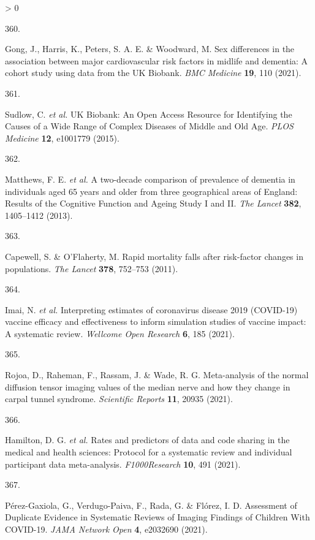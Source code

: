 \documentclass[a4paper, twoside]{templates/ociamthesis}
\newlength{\cslhangindent}
\newlength{\csllabelwidth}
\newenvironment{CSLReferences}[3] %
 {%
  \setlength{\parindent}{0pt}
  \ifodd #1 \everypar{\setlength{\hangindent}{\cslhangindent}}\ignorespaces\fi
  \ifnum #2 > 0
  \setlength{\parskip}{#2\baselineskip}
  \fi
 }%
 {}
\newcommand{\CSLLeftMargin}[1]{\parbox[t]{\maxof{\widthof{#1}}{\csllabelwidth}}{#1}}
\newcommand{\CSLRightInline}[1]{\parbox[t]{\linewidth - \csllabelwidth}{#1}}
\begin{document}
\begin{CSLReferences}{0}{0}
\leavevmode\hypertarget{ref-gong2021}{}%
\CSLLeftMargin{360. }
\CSLRightInline{Gong, J., Harris, K., Peters, S. A. E. \& Woodward, M. Sex differences in the association between major cardiovascular risk factors in midlife and dementia: A cohort study using data from the {UK Biobank}. \emph{BMC Medicine} \textbf{19}, 110 (2021).}

\leavevmode\hypertarget{ref-sudlow2015}{}%
\CSLLeftMargin{361. }
\CSLRightInline{Sudlow, C. \emph{et al.} {UK Biobank}: An {Open Access Resource} for {Identifying} the {Causes} of a {Wide Range} of {Complex Diseases} of {Middle} and {Old Age}. \emph{PLOS Medicine} \textbf{12}, e1001779 (2015).}

\leavevmode\hypertarget{ref-matthews2013}{}%
\CSLLeftMargin{362. }
\CSLRightInline{Matthews, F. E. \emph{et al.} A two-decade comparison of prevalence of dementia in individuals aged 65 years and older from three geographical areas of {England}: Results of the {Cognitive Function} and {Ageing Study I} and {II}. \emph{The Lancet} \textbf{382}, 1405--1412 (2013).}

\leavevmode\hypertarget{ref-capewell2011}{}%
\CSLLeftMargin{363. }
\CSLRightInline{Capewell, S. \& O'Flaherty, M. Rapid mortality falls after risk-factor changes in populations. \emph{The Lancet} \textbf{378}, 752--753 (2011).}

\leavevmode\hypertarget{ref-imai2021}{}%
\CSLLeftMargin{364. }
\CSLRightInline{Imai, N. \emph{et al.} Interpreting estimates of coronavirus disease 2019 ({COVID}-19) vaccine efficacy and effectiveness to inform simulation studies of vaccine impact: A systematic review. \emph{Wellcome Open Research} \textbf{6}, 185 (2021).}

\leavevmode\hypertarget{ref-rojoa2021}{}%
\CSLLeftMargin{365. }
\CSLRightInline{Rojoa, D., Raheman, F., Rassam, J. \& Wade, R. G. Meta-analysis of the normal diffusion tensor imaging values of the median nerve and how they change in carpal tunnel syndrome. \emph{Scientific Reports} \textbf{11}, 20935 (2021).}

\leavevmode\hypertarget{ref-hamilton2021}{}%
\CSLLeftMargin{366. }
\CSLRightInline{Hamilton, D. G. \emph{et al.} Rates and predictors of data and code sharing in the medical and health sciences: Protocol for a systematic review and individual participant data meta-analysis. \emph{F1000Research} \textbf{10}, 491 (2021).}

\leavevmode\hypertarget{ref-perez-gaxiola2021}{}%
\CSLLeftMargin{367. }
\CSLRightInline{Pérez-Gaxiola, G., Verdugo-Paiva, F., Rada, G. \& Flórez, I. D. Assessment of {Duplicate Evidence} in {Systematic Reviews} of {Imaging Findings} of {Children With COVID}-19. \emph{JAMA Network Open} \textbf{4}, e2032690 (2021).}


\end{CSLReferences}
\end{document}
